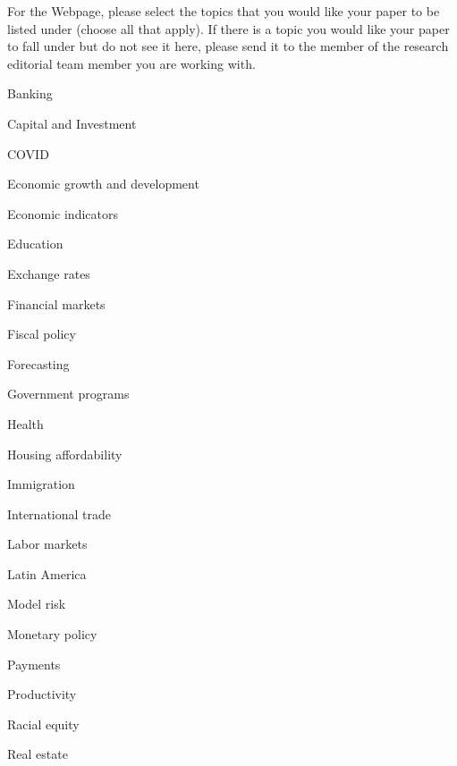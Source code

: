 \begin{instructionspage}

  \item
    For the Webpage, please select the topics that you would like your paper to be listed under
    (choose all that apply).
    If there is a topic you would like your paper to fall under but do not see it here,
    please send it to the member of the research editorial team member you are working with.
  
  \begin{multicols}{2}

    \checkbox Banking

    \checkbox Capital and Investment

    \checkbox COVID

    \checkbox Economic growth and development

    \checkbox Economic indicators

    \selectnext
    \checkbox Education

    \checkbox Exchange rates

    \checkbox Financial markets

    \checkbox Fiscal policy

    \checkbox Forecasting

    \checkbox Government programs

    \checkbox Health

    \checkbox Housing affordability

    \checkbox Immigration

    \checkbox International trade

    \checkbox Labor markets

    \checkbox Latin America

    \checkbox Model risk

    \checkbox Monetary policy

    \checkbox Payments

    \checkbox Productivity

    \checkbox Racial equity

    \checkbox Real estate


\end{multicols}
\end{instructionspage}
